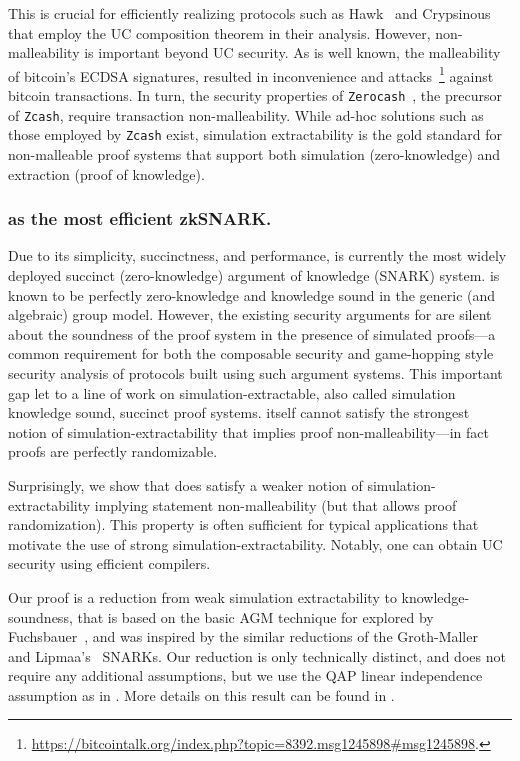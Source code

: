 \documentclass[runningheads,10pt]{llncs}
\begin{document}
  This is crucial for efficiently realizing protocols such as Hawk~\cite{SP:KMSWP16} and
  Crypsinous~\cite{SP:KKKZ19} that employ the UC composition theorem in their analysis. However,
  non-malleability is important beyond UC security. As is well known, the
  malleability of bitcoin's ECDSA signatures, resulted in inconvenience and
  attacks~\footnote{\url{https://bitcointalk.org/index.php?topic=8392.msg1245898\#msg1245898}.}
  against bitcoin transactions.
  In turn, the security properties of \texttt{Zerocash}~\cite{SP:BCGGMT14}, the precursor of
  \texttt{Zcash}, require transaction non-malleability. While ad-hoc solutions
  such as those employed by \texttt{Zcash} exist, simulation
  extractability is the gold standard for non-malleable proof systems that support both
  simulation (zero-knowledge) and extraction (proof of knowledge).

    \subsubsection*{\groth{} as the most efficient zkSNARK.}
    Due to its simplicity, succinctness, and performance, \groth{} is
  currently the most widely deployed succinct (zero-knowledge) argument of
  knowledge (SNARK) system. \groth{} is known to be perfectly zero-knowledge and knowledge sound in the generic (and algebraic) group model. However, the existing security arguments for \groth{} are silent about the soundness of the proof system in the presence of simulated proofs---a common requirement for both the composable security and game-hopping style security analysis of protocols built using such argument systems. This important gap let to a line of work on simulation-extractable, also called simulation knowledge sound, succinct proof systems. \groth{} itself cannot satisfy the strongest
  notion of simulation-extractability that implies proof
  non-malleability---in fact proofs are perfectly randomizable.

  Surprisingly, we show that \groth{} does satisfy a weaker notion of
  simulation-extractability implying statement non-malleability (but
  that allows proof randomization). This property is often sufficient
  for typical applications that motivate the use of strong
  simulation-extractability. Notably, one can obtain UC security using
  efficient compilers.

  Our proof is a reduction from weak simulation extractability to
  knowledge-soundness, that is based on the basic AGM technique
  for \groth{} explored by Fuchsbauer~\cite{C:FucKilLos18}, and was
  inspired by the similar reductions of the
  Groth-Maller~\cite{C:GroMal17} and Lipmaa's~\cite{EPRINT:Lipmaa19b}
  SNARKs. Our reduction is only technically distinct, and does not
  require any additional assumptions, but we use the QAP linear
  independence assumption as in \cite{C:GroMal17}. More details on
  this result can be found in \cite{EPRINT:KohVol20}.
\end{document}
